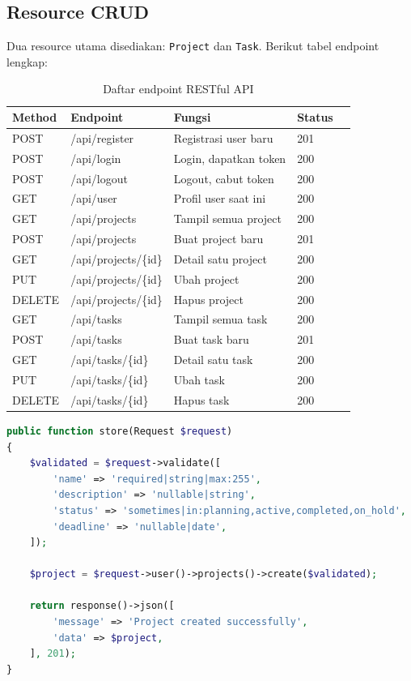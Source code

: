 \documentclass[12pt,letterpaper]{report}
\begin{document}
\subsection{Resource CRUD}
Dua resource utama disediakan: \texttt{Project} dan \texttt{Task}. Berikut tabel endpoint lengkap:

\begin{table}[H]
\centering
\begin{tabular}{lllll}
\toprule
\textbf{Method} & \textbf{Endpoint} & \textbf{Fungsi} & \textbf{Status} \\
\midrule
POST   & /api/register         & Registrasi user baru      & 201 \\
POST   & /api/login            & Login, dapatkan token      & 200 \\
POST   & /api/logout           & Logout, cabut token        & 200 \\
GET    & /api/user             & Profil user saat ini       & 200 \\
\midrule
GET    & /api/projects         & Tampil semua project       & 200 \\
POST   & /api/projects         & Buat project baru          & 201 \\
GET    & /api/projects/\{id\}  & Detail satu project        & 200 \\
PUT    & /api/projects/\{id\}  & Ubah project               & 200 \\
DELETE & /api/projects/\{id\}  & Hapus project              & 200 \\
\midrule
GET    & /api/tasks            & Tampil semua task          & 200 \\
POST   & /api/tasks            & Buat task baru             & 201 \\
GET    & /api/tasks/\{id\}     & Detail satu task           & 200 \\
PUT    & /api/tasks/\{id\}     & Ubah task                  & 200 \\
DELETE & /api/tasks/\{id\}     & Hapus task                 & 200 \\
\bottomrule
\end{tabular}
\caption{Daftar endpoint RESTful API}
\end{table}

\begin{lstlisting}[language=php,caption={Potongan kode ProjectController -- store}]
public function store(Request $request)
{
    $validated = $request->validate([
        'name' => 'required|string|max:255',
        'description' => 'nullable|string',
        'status' => 'sometimes|in:planning,active,completed,on_hold',
        'deadline' => 'nullable|date',
    ]);

    $project = $request->user()->projects()->create($validated);

    return response()->json([
        'message' => 'Project created successfully',
        'data' => $project,
    ], 201);
}
\end{lstlisting}
\end{document}
